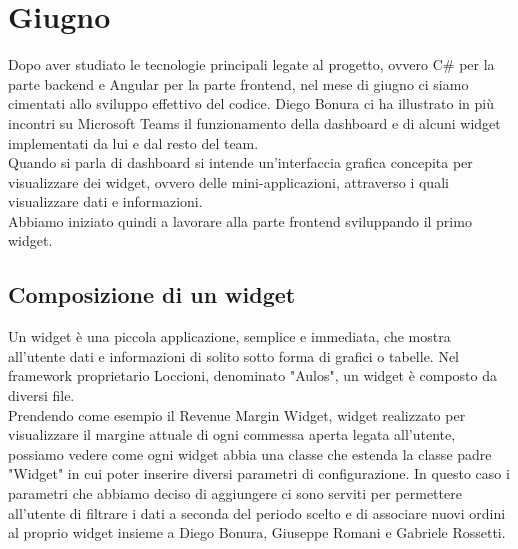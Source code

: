 \chapter{Giugno}
\label{chap:giugno}

Dopo aver studiato le tecnologie principali legate al progetto, ovvero C\# per la parte backend e Angular per la parte frontend, nel mese di giugno ci siamo cimentati allo sviluppo effettivo del codice.
Diego Bonura ci ha illustrato in più incontri su Microsoft Teams il funzionamento della dashboard e di alcuni widget implementati da lui e dal resto del team. \\ Quando si parla di dashboard si intende 
un'interfaccia grafica concepita per visualizzare dei widget, ovvero delle mini-applicazioni, attraverso i quali visualizzare dati e informazioni.
\\ Abbiamo iniziato quindi a lavorare alla parte frontend sviluppando il primo widget.

\section{Composizione di un widget}
Un widget è una piccola applicazione, semplice e immediata, che mostra all'utente dati e informazioni di solito sotto forma di grafici o tabelle. Nel framework proprietario Loccioni, denominato "Aulos", un widget è composto da diversi file. \\ Prendendo come esempio il Revenue Margin Widget, widget realizzato per visualizzare il margine attuale di ogni commessa aperta legata all'utente, possiamo vedere come ogni widget abbia una classe che estenda la classe padre "Widget" in cui poter inserire diversi parametri di configurazione. In questo caso i parametri che abbiamo deciso di aggiungere ci sono serviti per permettere all'utente di filtrare i dati a seconda del periodo scelto e di associare nuovi ordini al proprio widget insieme a Diego Bonura, Giuseppe Romani e Gabriele Rossetti.


